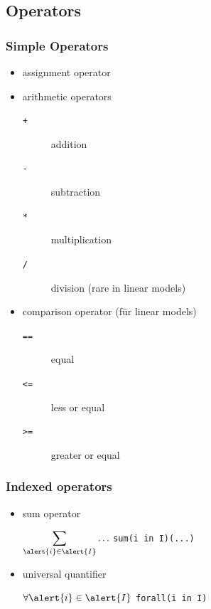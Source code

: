 \subsection{Operators}
\begin{frame}
 \frametitle{Simple Operators}
 \begin{itemize}
  \item assignment operator \structure{\texttt{=}}
  \item arithmetic operators
  \begin{description}
   \item[\texttt{+}] addition
   \item[\texttt{-}] subtraction
   \item[\texttt{*}] multiplication
   \item[\texttt{/}] division (rare in linear models)
  \end{description}
  \item comparison operator (für linear models)
  \begin{description}
   \item[\texttt{==}] equal
   \item[\texttt{<=}] less or equal
   \item[\texttt{>=}] greater or equal
  \end{description}
 \end{itemize}
\end{frame}

\begin{frame}
 \frametitle{Indexed operators}
 \begin{itemize}
  \item sum operator
  \begin{flushleft}\Large
   {$\displaystyle\sum_{\alert{i}\in \alert{I}}\ldots$} 
   \textrightarrow{} 
   { \texttt{sum(\alert{i} in \alert{I})(\textsf{...})}}
  \end{flushleft}
  \medskip
  \item universal quantifier
  \begin{flushleft}\Large
   {$\displaystyle\forall {\alert{i}\in \alert{I}}$} 
   \textrightarrow{} 
   { \texttt{forall(\alert{i} in \alert{I})}}
  \end{flushleft}
 \end{itemize}

\end{frame}


